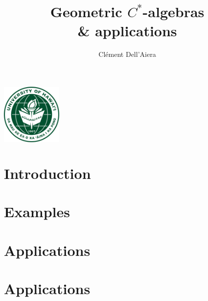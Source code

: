 \documentclass{beamer}
\title[First Steps with SCRATCH]{Geometric $C^*$-algebras\\ \& applications}
\author{Clément Dell'Aiera}
\institute{University of Hawaii at Manoa}
\date{}
\begin{document}
\begin{frame}
\titlepage
\begin{center} \includegraphics[width=3cm]{UH_logo.png}\end{center}
\end{frame}

\begin{frame}
  \tableofcontents\end{frame}

\section{Introduction}


\section{Examples}
\begin{frame}
  \tableofcontents[currentsection]
\end{frame}


\section{Applications}
\begin{frame}
  \tableofcontents[currentsection]
\end{frame}




\section{Applications}
\begin{frame}
  \tableofcontents[currentsection]
\end{frame}

\end{document}
